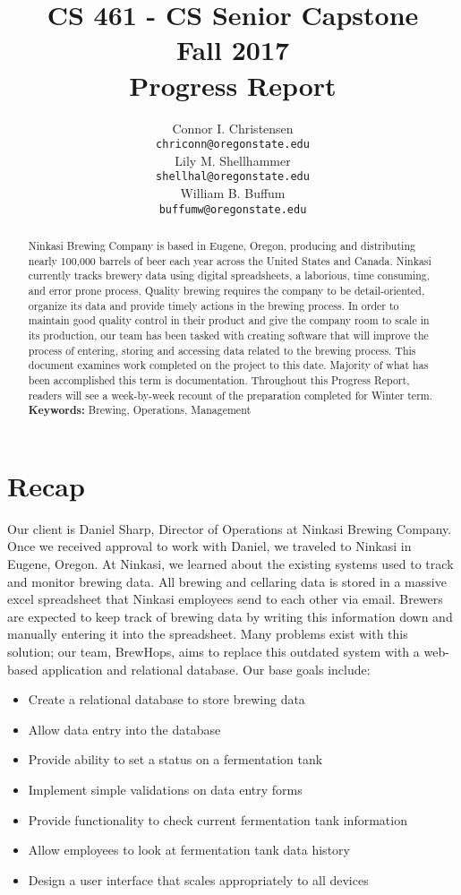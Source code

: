 \documentclass[draftclsnofoot,onecolumn,letterpaper,10pt,compsoc]{IEEEtran}
\title{CS 461 - CS Senior Capstone
	\\Fall 2017
	\\Progress Report
}
\author{
	Connor I. Christensen \\
	\texttt{chriconn@oregonstate.edu}
	\\
	Lily M. Shellhammer \\
	\texttt{shellhal@oregonstate.edu}
	\\
	William B. Buffum \\
	\small{}
	\texttt{buffumw@oregonstate.edu}
}
\begin{document}
\begin{titlingpage}
    \maketitle
    \begin{abstract}
			Ninkasi Brewing Company is based in Eugene, Oregon, producing and distributing nearly 100,000 barrels of beer each year across the United States and Canada.
			Ninkasi currently tracks brewery data using digital spreadsheets, a laborious, time consuming, and error prone process.
			Quality brewing requires the company to be detail-oriented, organize its data and provide timely actions in the brewing process.
			In order to maintain good quality control in their product and give the company room to scale in its production, our team has been tasked with creating software that will improve the process of entering, storing and accessing data related to the brewing process.
			This document examines work completed on the project to this date.
			Majority of what has been accomplished this term is documentation.
			Throughout this Progress Report, readers will see a week-by-week recount of the preparation completed for Winter term.
			\\
			\textbf{Keywords:} Brewing, Operations, Management
    \end{abstract}
		\pagebreak
		\tableofcontents
\end{titlingpage}

\section{Recap}
Our client is Daniel Sharp, Director of Operations at Ninkasi Brewing Company.
Once we received approval to work with Daniel, we traveled to Ninkasi in Eugene, Oregon.
At Ninkasi, we learned about the existing systems used to track and monitor brewing data.
All brewing and cellaring data is stored in a massive excel spreadsheet that Ninkasi employees send to each other via email.
Brewers are expected to keep track of brewing data by writing this information down and manually entering it into the spreadsheet.
Many problems exist with this solution; our team, BrewHops, aims to replace this outdated system with a web-based application and relational database.
Our base goals include:
\begin{itemize}
  \item Create a relational database to store brewing data
  \item Allow data entry into the database
  \item Provide ability to set a status on a fermentation tank
  \item Implement simple validations on data entry forms
  \item Provide functionality to check current fermentation tank information
  \item Allow employees to look at fermentation tank data history
  \item Design a user interface that scales appropriately to all devices
\end{itemize}
\end{document}
